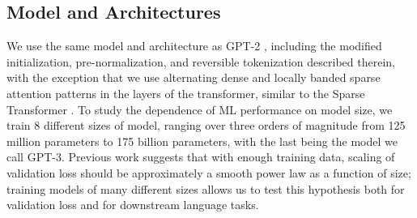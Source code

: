 \documentclass{article}
\begin{document}
    \subsection{Model and Architectures}
    \label{section:Model and Architectures}
We use the same model and architecture as GPT-2 \cite{radford2019language}, including the modified initialization, pre-normalization, and reversible tokenization described therein, with the exception that we use alternating dense and locally banded sparse attention patterns in the layers of the transformer, similar to the Sparse Transformer \cite{child2019generating}. To study the dependence of ML performance on model size, we train 8 different sizes of model, ranging over three orders of magnitude from 125 million parameters to 175 billion parameters, with the last being the model we call GPT-3.  Previous work \cite{kaplan2020scaling} suggests that with enough training data, scaling of validation loss should be approximately a smooth power law as a function of size; training models of many different sizes allows us to test this hypothesis both for validation loss and for downstream language tasks.
\end{document}

